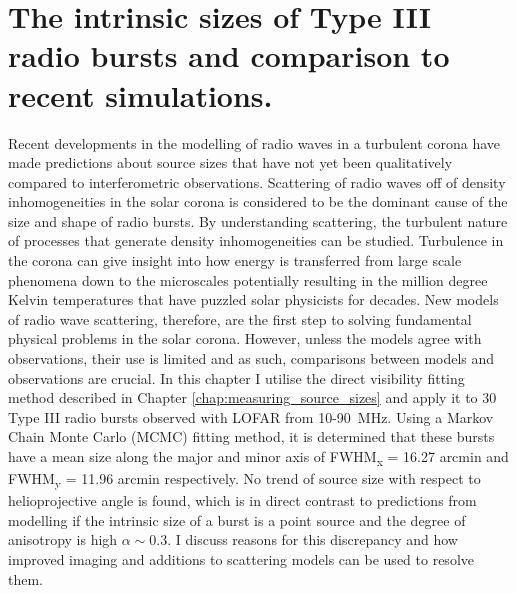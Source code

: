 \doublespacing
\chapter{The intrinsic sizes of Type III radio bursts and comparison to recent simulations.}
\label{chap:observations_vs_theory}
Recent developments in the modelling of radio waves in a turbulent corona have made predictions about source sizes that have not yet been qualitatively compared to interferometric observations. Scattering of radio waves off of density inhomogeneities in the solar corona is considered to be the dominant cause of the size and shape of radio bursts. By understanding scattering, the turbulent nature of processes that generate density inhomogeneities can be studied. Turbulence in the corona can give insight into how energy is transferred from large scale phenomena down to the microscales potentially resulting in the million degree Kelvin temperatures that have puzzled solar physicists for decades. New models of radio wave scattering, therefore, are the first step to solving fundamental physical problems in the solar corona. However, unless the models agree with observations, their use is limited and as such, comparisons between models and observations are crucial. In this chapter I utilise the direct visibility fitting method described in Chapter \ref{chap:measuring_source_sizes} and apply it to 30 Type III radio bursts observed with LOFAR from 10-90~MHz. Using a Markov Chain Monte Carlo (MCMC) fitting method, it is determined that these bursts have a mean size along the major and minor axis of FWHM\textsubscript{x} = 16.27 arcmin and FWHM\textsubscript{y} = 11.96 arcmin respectively. No trend of source size with respect to helioprojective angle is found, which is in direct contrast to predictions from modelling if the intrinsic size of a burst is a point source and the degree of anisotropy is high $\alpha \sim 0.3$. I discuss reasons for this discrepancy and how improved imaging and additions to scattering models can be used to resolve them.

